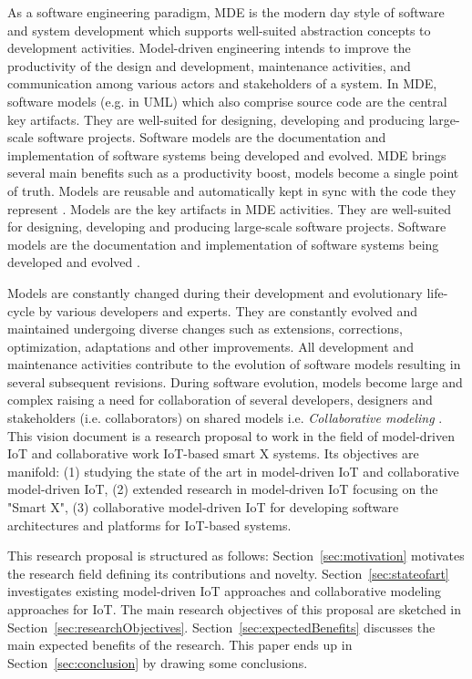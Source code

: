 As a software engineering paradigm, MDE is the modern day style of software and system development which supports well-suited abstraction concepts to development activities. Model-driven engineering intends to improve the productivity of the design and development, maintenance activities, and communication among various actors and stakeholders of a system. In MDE, software models (e.g. in UML) which also comprise source code are the central key artifacts. They are well-suited for designing, developing and producing large-scale software projects. Software models are the documentation and implementation of software systems being developed and evolved. MDE brings several main benefits such as a productivity boost, models become a single point of truth. Models are reusable and automatically kept in sync with the code they represent \cite{Fleurey+2011}. Models are the key artifacts in MDE activities. They are well-suited for designing, developing and producing large-scale software projects. Software models are the documentation and implementation of software systems being developed and evolved \cite{Kleppe+2003}.

Models are constantly changed during their development and evolutionary life-cycle by various developers and experts. They are constantly evolved and maintained undergoing diverse changes such as extensions, corrections, optimization, adaptations and other improvements. All development and maintenance activities contribute to the evolution of software models resulting in several subsequent revisions. During software evolution, models become large and complex raising a need for collaboration of several developers, designers and stakeholders (i.e. collaborators) on shared models i.e. \textit{Collaborative modeling} \cite{Kuryazov+2018}. This vision document is a research proposal to work in the field of model-driven IoT and collaborative work IoT-based smart X systems. Its objectives are manifold: (1) studying the state of the art in model-driven IoT and collaborative model-driven IoT, (2) extended research in model-driven IoT focusing on the "Smart X", (3) collaborative model-driven IoT for developing software architectures and platforms for IoT-based systems.

This research proposal is structured as follows: Section~\ref{sec:motivation} motivates the research field defining its contributions and novelty. Section~\ref{sec:stateofart} investigates existing model-driven IoT approaches and collaborative modeling approaches for IoT. The main research objectives of this proposal are sketched in Section~\ref{sec:researchObjectives}. Section~\ref{sec:expectedBenefits} discusses the main expected benefits of the research. This paper ends up in Section~\ref{sec:conclusion} by drawing some conclusions.